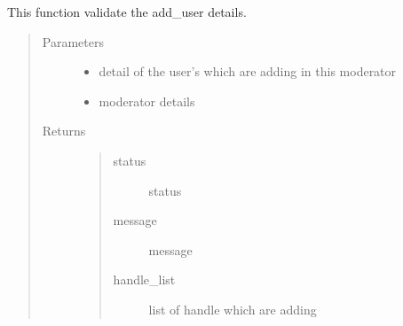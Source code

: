 \documentclass[letterpaper,10pt,english]{sphinxmanual}
\begin{document}

\begin{fulllineitems}
\label{\detokenize{janta:janta.viewhelper.validate_add_user}}
This function validate the add\_user details.
\begin{quote}\begin{description}
\item[{Parameters}] \leavevmode\begin{itemize}
\item {} 
 \textendash{} detail of the  user’s  which are adding in this moderator

\item {} 
 \textendash{} moderator details

\end{itemize}

\item[{Returns}] \leavevmode
\begin{quote}\begin{description}
\item[{status}] \leavevmode
status

\item[{message}] \leavevmode
message

\item[{handle\_list}] \leavevmode
list of handle which are adding

\end{description}\end{quote}


\end{description}\end{quote}

\end{fulllineitems}

\end{document}
